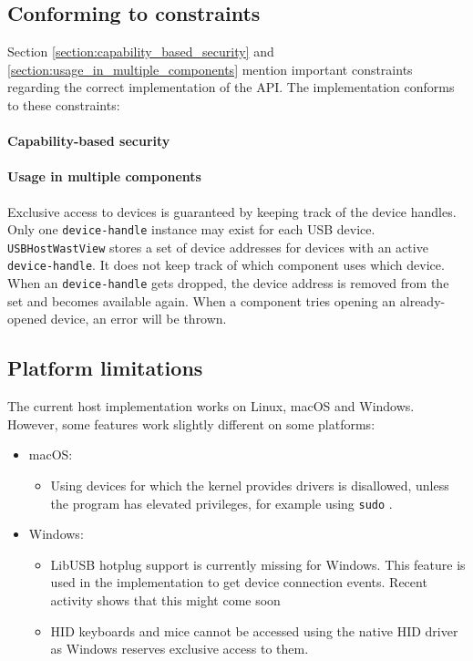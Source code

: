 \subsection{Conforming to constraints}
Section \ref{section:capability_based_security} and \ref{section:usage_in_multiple_components} mention important constraints regarding the correct implementation of the API. The implementation conforms to these constraints:

\paragraph{Capability-based security}

\paragraph{Usage in multiple components} Exclusive access to devices is guaranteed by keeping track of the device handles. Only one \texttt{device-handle} instance may exist for each \acrshort{USB} device. \texttt{USBHostWastView} stores a set of device addresses for devices with an active \texttt{device-handle}. It does not keep track of which component uses which device. When an \texttt{device-handle} gets dropped, the device address is removed from the set and becomes available again. When a component tries opening an already-opened device, an error will be thrown. 

\subsection{Platform limitations}
The current host implementation works on Linux, macOS and Windows. However, some features work slightly different on some platforms:

\begin{itemize}
\item macOS: 
\begin{itemize}
\item Using devices for which the kernel provides drivers is disallowed, unless the program has elevated privileges, for example using \texttt{sudo} \cite{libusb_macos_limitations}.
\end{itemize}

\item Windows:
\begin{itemize}
\item LibUSB hotplug support is currently missing for Windows. This feature is used in the implementation to get device connection events. Recent activity shows that this might come soon \cite{libusb_hotplug_support}
\item HID keyboards and mice cannot be accessed using the native HID driver as Windows reserves exclusive access to them. \cite{libusb_windows_limitations}
\end{itemize}
\end{itemize}


